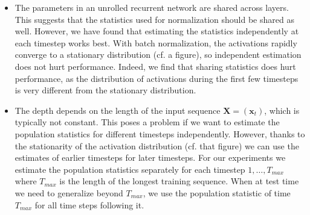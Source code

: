 \documentclass{article} %
\newcommand{\vect}[1]{\mathbf{#1}}
\newcommand{\mat}[1]{\mathbf{#1}}
\begin{document}
\begin{itemize}
\item
The parameters in an unrolled recurrent network are shared across layers.
This suggests that the statistics used for normalization should be shared as well.
However, we have found that estimating the statistics independently at each timestep works best.
With batch normalization, the activations rapidly converge to a stationary distribution (cf. a figure), so independent estimation does not hurt performance.
Indeed, we find that sharing statistics does hurt performance, as the distribution of activations during the first few timesteps is very different from the stationary distribution.
\\ \item
The depth depends on the length of the input sequence $\mat{X} = (\vect{x}_t)$, which is typically not constant.
This poses a problem if we want to estimate the population statistics for different timesteps independently.
However, thanks to the stationarity of the activation distribution (cf. that figure) we can use the estimates of earlier timesteps for later timesteps.
For our experiments we estimate the population statistics separately for each timestep $1, \ldots, T_{max}$ where $T_{max}$ is the length of the longest training sequence.
When at test time we need to generalize beyond $T_{max}$, we use the population statistic of time $T_{max}$ for all time steps following it.


\end{itemize}
\end{document}
